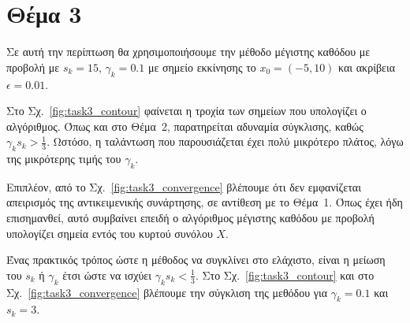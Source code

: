 \documentclass[a4paper,12pt]{article}
\begin{document}
\section*{Θέμα 3}
Σε αυτή την περίπτωση θα χρησιμοποιήσουμε την μέθοδο μέγιστης καθόδου με προβολή με $s_k = 15$, $\gamma_k = 0.1$
με σημείο εκκίνησης το $x_0 = (-5, 10)$ και ακρίβεια $\epsilon = 0.01$.

Στο Σχ.~\ref{fig:task3_contour} φαίνεται η τροχία των σημείων που υπολογίζει ο αλγόριθμος. Όπως και στο Θέμα~2, 
παρατηρείται αδυναμία σύγκλισης, καθώς $\gamma_k s_k > \frac{1}{3}$. Ωστόσο, η ταλάντωση που παρουσιάζεται 
έχει πολύ μικρότερο πλάτος, λόγω της μικρότερης τιμής του $\gamma_k$. 

Επιπλέον, από το Σχ.~\ref{fig:task3_convergence} βλέπουμε ότι δεν εμφανίζεται απειρισμός της αντικειμενικής συνάρτησης, 
σε αντίθεση με το Θέμα~1. Όπως έχει ήδη επισημανθεί, αυτό συμβαίνει επειδή ο αλγόριθμος μέγιστης καθόδου με προβολή 
υπολογίζει σημεία εντός του κυρτού συνόλου $X$.

Ένας πρακτικός τρόπος ώστε η μέθοδος να συγκλίνει στο ελάχιστο, είναι η μείωση του $s_k$ ή $\gamma_k$ έτσι ώστε
να ισχύει $\gamma_k s_k < \frac{1}{3}$. Στο Σχ.~\ref{fig:task3_contour} και στο Σχ.~\ref{fig:task3_convergence} 
βλέπουμε την σύγκλιση της μεθόδου για $\gamma_k = 0.1$ και $s_k = 3$.
\end{document}
